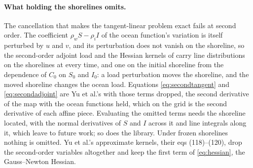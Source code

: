 \documentclass[11pt,a4paper]{article}
\numberwithin{equation}{section}
\begin{document}
\paragraph{What holding the shorelines omits.} The cancellation that makes
the tangent-linear problem exact fails at second order. The coefficient
$\rho_{w}S-\rho_{i}I$ of the ocean function's variation is itself perturbed
by $u$ and $v$, and its perturbation does not vanish on the shoreline, so the
second-order adjoint load and the Hessian kernels of \citet[eqs 112, 116 and
117]{YuEtAl2025} carry line distributions on the shorelines at every time, and
one on the initial shoreline from the dependence of $C_{0}$ on $S_{0}$ and
$I_{0}$: a load perturbation moves the shoreline, and the moved shoreline
changes the ocean load. Equations \eqref{eq:secondtangent} and
\eqref{eq:secondadjoint} are Yu et al.'s with those terms dropped, the second
derivative of the map with the ocean functions held, which on the grid is
the second derivative of each affine piece. Evaluating the omitted terms
needs the shoreline located, with the normal derivatives of $S$ and $I$
across it and line integrals along it, which \citet{YuEtAl2025} leave to
future work; so does the library. Under frozen shorelines nothing is omitted.
Yu et al.'s approximate kernels, their eqs (118)--(120), drop the
second-order variables altogether and keep the first term of
\eqref{eq:hessian}, the Gauss--Newton Hessian.
\end{document}
